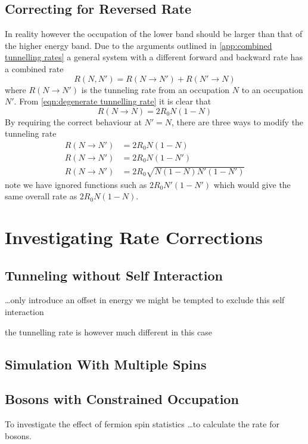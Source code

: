 \subsection{Correcting for Reversed Rate}
In reality however the occupation
of the lower band should be larger than
that of the higher energy band. Due to
the arguments outlined in
\cref{app:combined tunnelling rates}
a general system with a different
forward and backward rate has a combined rate
\begin{equation}
    R(N,N') = R(N\rightarrow{}N') + R(N'\rightarrow{}N)
\end{equation}
where \(R(N\rightarrow{}N')\) is the
tunneling rate from an occupation \(N\)
to an occupation \(N'\). From
\cref{eqn:degenerate tunnelling rate}
it is clear that
\begin{equation}
    R(N\rightarrow{}N) = 2R_0N(1-N)
\end{equation}
By requiring the correct
behaviour at \(N' = N\), there are
three ways to modify the tunneling
rate
\begin{align}
    R(N\rightarrow{}N') & = 2R_0N(1-N)                 \\
    R(N\rightarrow{}N') & = 2R_0N(1-N')                \\
    R(N\rightarrow{}N') & = 2R_0 \sqrt{N(1-N)N'(1-N')}
\end{align}
note we have ignored functions
such as \(2R_0N'(1-N')\) which
would give the same overall rate
as \(2R_0N(1-N)\).

\section{Investigating Rate Corrections}





\subsection{Tunneling without Self Interaction}
\ldots only introduce an offset in energy
we might be tempted to exclude this self interaction

the tunnelling rate is however much different
in this case





\subsection{Simulation With Multiple Spins}


\subsection{Bosons with Constrained Occupation}
To investigate the effect of fermion spin
statistics \ldots to calculate the rate
for bosons.
